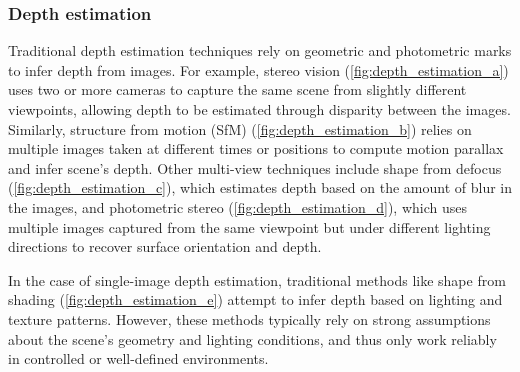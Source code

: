 \subsubsection{Depth estimation}
\label{sec:depth_estimation}

Traditional depth estimation techniques \cite{computer_vision_depth_estimation} rely on geometric and photometric marks to infer depth from images. For example, stereo vision (\ref{fig:depth_estimation_a}) uses two or more cameras to capture the same scene from slightly different viewpoints, allowing depth to be estimated through disparity between the images. Similarly, structure from motion (SfM) (\ref{fig:depth_estimation_b}) relies on multiple images taken at different times or positions to compute motion parallax and infer scene's depth. Other multi-view techniques include shape from defocus (\ref{fig:depth_estimation_c}), which estimates depth based on the amount of blur in the images, and photometric stereo (\ref{fig:depth_estimation_d}), which uses multiple images captured from the same viewpoint but under different lighting directions to recover surface orientation and depth.

In the case of single-image depth estimation, traditional methods like shape from shading (\ref{fig:depth_estimation_e}) attempt to infer depth based on lighting and texture patterns. However, these methods typically rely on strong assumptions about the scene's geometry and lighting conditions, and thus only work reliably in controlled or well-defined environments.

